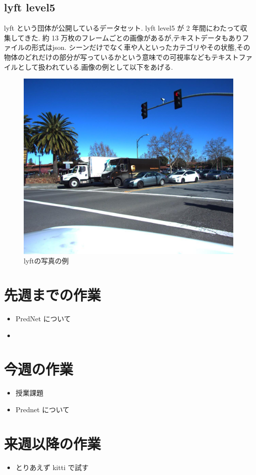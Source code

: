 \subsection{lyft level5}
lyft という団体が公開しているデータセット. lyft level5 が 2 年間にわたって収集してきた.
約 13 万枚のフレームごとの画像があるが,テキストデータもありファイルの形式はjson. シーンだけでなく車や人といったカテゴリやその状態,その物体のどれだけの部分が写っているかという意味での可視率などもテキストファイルとして扱われている.画像の例として以下をあげる.
 \begin{figure}[hb]
\includegraphics[scale=0.2]{host-a007_cam1_1233515297634286006.jpeg}
 \caption{lyftの写真の例}
\end{figure}

\section{先週までの作業}
\begin{itemize}
          \item PredNet について
          \item 
\end{itemize}

\section{今週の作業}
\begin{itemize}
         \item 授業課題
         \item Prednet について
\end{itemize}

\section{来週以降の作業}
\begin{itemize}
         \item とりあえず kitti で試す
\end{itemize}





